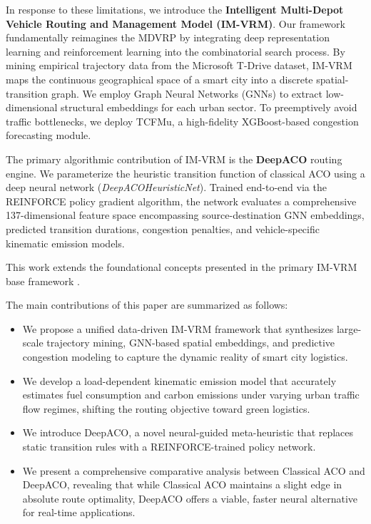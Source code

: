 \documentclass[conference]{IEEEtran}
\begin{document}
In response to these limitations, we introduce the \textbf{Intelligent Multi-Depot Vehicle Routing and Management Model (IM-VRM)}. Our framework fundamentally reimagines the MDVRP by integrating deep representation learning and reinforcement learning into the combinatorial search process. By mining empirical trajectory data from the Microsoft T-Drive dataset, IM-VRM maps the continuous geographical space of a smart city into a discrete spatial-transition graph. We employ Graph Neural Networks (GNNs) to extract low-dimensional structural embeddings for each urban sector. To preemptively avoid traffic bottlenecks, we deploy TCFMu, a high-fidelity XGBoost-based congestion forecasting module.

The primary algorithmic contribution of IM-VRM is the \textbf{DeepACO} routing engine. We parameterize the heuristic transition function of classical ACO using a deep neural network (\textit{DeepACOHeuristicNet}). Trained end-to-end via the REINFORCE policy gradient algorithm, the network evaluates a comprehensive 137-dimensional feature space encompassing source-destination GNN embeddings, predicted transition durations, congestion penalties, and vehicle-specific kinematic emission models. 

This work extends the foundational concepts presented in the primary IM-VRM base framework \cite{base_paper}.

The main contributions of this paper are summarized as follows:
\begin{itemize}
    \item We propose a unified data-driven IM-VRM framework that synthesizes large-scale trajectory mining, GNN-based spatial embeddings, and predictive congestion modeling to capture the dynamic reality of smart city logistics.
    \item We develop a load-dependent kinematic emission model that accurately estimates fuel consumption and carbon emissions under varying urban traffic flow regimes, shifting the routing objective toward green logistics.
    \item We introduce DeepACO, a novel neural-guided meta-heuristic that replaces static transition rules with a REINFORCE-trained policy network. 
    \item We present a comprehensive comparative analysis between Classical ACO and DeepACO, revealing that while Classical ACO maintains a slight edge in absolute route optimality, DeepACO offers a viable, faster neural alternative for real-time applications.
\end{itemize}
\end{document}
